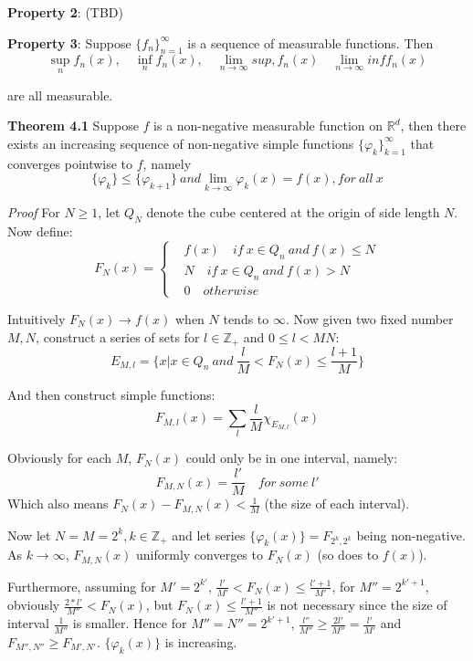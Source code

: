 \documentclass[
]{article}
\begin{document}
\textbf{Property 2}: (TBD)

\textbf{Property 3}: Suppose \(\{f_n\}_{n=1}^{\infty}\) is a sequence of measurable functions.
Then
\[\sup_n f_n(x), \quad \inf_n f_n(x), \quad\lim_{n\to\infty} sup, f_n(x) \quad\lim_{n\to\infty} inf f_n(x)\]

are all measurable.

\vspace{2mm}
\textbf{Theorem 4.1}
Suppose \(f\) is a non-negative measurable function on \(\mathbb{R}^d\),
then there exists an increasing sequence of non-negative simple functions
\(\{\varphi_k\}^{\infty}_{k=1}\) that converges pointwise to \(f\), namely
\[\{\varphi_k\}\leq \{\varphi_{k+1}\}\ and \lim_{k\to \infty}\varphi_k(x)=f(x), for\ all\ x\]

\textit{Proof}
For \(N\geq 1\), let \(Q_N\) denote the cube centered at the origin of side length
\(N\). Now define:
\begin{equation}
F_N(x)=
\left\{\begin{aligned}
  & f(x) \quad if\ x \in Q_n\ and\ f(x) \leq N \\ 
  & N \quad if\ x \in Q_n\ and\ f(x) > N \\
  & 0 \quad otherwise
\end{aligned}\right.
\end{equation}

Intuitively \(F_N(x)\to f(x)\) when \(N\) tends to \(\infty\). Now given two fixed number \(M, N\), construct a series of sets for \(l \in \mathbb{Z_+}\) and
\(0 \leq l < MN\):
\[
  E_{M, l} = \{x | x \in Q_n\ and\ \frac{l}{M} < F_N(x) \leq \frac{l+1}{M} \}
\]

And then construct simple functions:
\[
  F_{M, l}(x)=\sum_{l}\frac{l}{M}\chi_{E_{M, l}}(x)
\]

Obviously for each \(M\), \(F_N(x)\) could only be in one interval, namely:
\[
  F_{M, N}(x)=\frac{l'}{M}\quad for\ some\ l'
\]
Which also means \(F_N(x) - F_{M, N}(x) < \frac{1}{M}\) (the size of each interval).

Now let \(N = M = 2^k, k\in\mathbb{Z_+}\) and let series
\(\{\varphi_k(x)\}=F_{2^k, 2^k}\) being non-negative.
As \(k\to \infty\), \(F_{M, N}(x)\) uniformly converges to \(F_N(x)\)
(so does to \(f(x)\)).

Furthermore, assuming for \(M'=2^{k'}\), \(\frac{l'}{M'}<F_N(x)\leq\frac{l'+1}{M'}\),
for \(M''=2^{k'+1}\), obviously \(\frac{2*l'}{M''}<F_N(x)\), but \(F_N(x)\leq \frac{l'+1}{M''}\)
is not necessary since the size of interval \(\frac{1}{M''}\) is smaller. Hence
for \(M''=N''=2^{k'+1}\), \(\frac{l''}{M''}\geq \frac{2l'}{M''}=\frac{l'}{M'}\) and
\(F_{M'', N''}\geq F_{M', N'}\). \(\{\varphi_k(x)\}\) is increasing.
\end{document}
